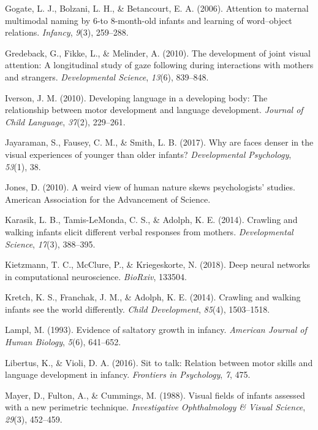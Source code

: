 \documentclass[english,man]{apa6}
\begin{document}
\hypertarget{ref-gogate2006attention}{}
Gogate, L. J., Bolzani, L. H., \& Betancourt, E. A. (2006). Attention to
maternal multimodal naming by 6-to 8-month-old infants and learning of
word--object relations. \emph{Infancy}, \emph{9}(3), 259--288.

\hypertarget{ref-gredeback2010development}{}
Gredeback, G., Fikke, L., \& Melinder, A. (2010). The development of
joint visual attention: A longitudinal study of gaze following during
interactions with mothers and strangers. \emph{Developmental Science},
\emph{13}(6), 839--848.

\hypertarget{ref-iverson2010}{}
Iverson, J. M. (2010). Developing language in a developing body: The
relationship between motor development and language development.
\emph{Journal of Child Language}, \emph{37}(2), 229--261.

\hypertarget{ref-jayaraman2017faces}{}
Jayaraman, S., Fausey, C. M., \& Smith, L. B. (2017). Why are faces
denser in the visual experiences of younger than older infants?
\emph{Developmental Psychology}, \emph{53}(1), 38.

\hypertarget{ref-jones2010weird}{}
Jones, D. (2010). A weird view of human nature skews psychologists'
studies. American Association for the Advancement of Science.

\hypertarget{ref-karasik2014}{}
Karasik, L. B., Tamis-LeMonda, C. S., \& Adolph, K. E. (2014). Crawling
and walking infants elicit different verbal responses from mothers.
\emph{Developmental Science}, \emph{17}(3), 388--395.

\hypertarget{ref-kietzmann2018deep}{}
Kietzmann, T. C., McClure, P., \& Kriegeskorte, N. (2018). Deep neural
networks in computational neuroscience. \emph{BioRxiv}, 133504.

\hypertarget{ref-kretch2014}{}
Kretch, K. S., Franchak, J. M., \& Adolph, K. E. (2014). Crawling and
walking infants see the world differently. \emph{Child Development},
\emph{85}(4), 1503--1518.

\hypertarget{ref-lampl1993evidence}{}
Lampl, M. (1993). Evidence of saltatory growth in infancy.
\emph{American Journal of Human Biology}, \emph{5}(6), 641--652.

\hypertarget{ref-libertus2016sit}{}
Libertus, K., \& Violi, D. A. (2016). Sit to talk: Relation between
motor skills and language development in infancy. \emph{Frontiers in
Psychology}, \emph{7}, 475.

\hypertarget{ref-mayer1988}{}
Mayer, D., Fulton, A., \& Cummings, M. (1988). Visual fields of infants
assessed with a new perimetric technique. \emph{Investigative
Ophthalmology \& Visual Science}, \emph{29}(3), 452--459.
\end{document}
